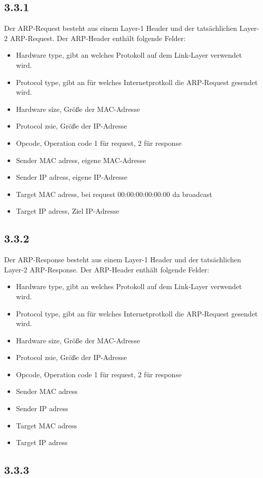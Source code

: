 \documentclass[a4paper,url]{article}
\begin{document}
\subsection*{3.3.1}
Der ARP-Request besteht aus einem Layer-1 Header und der tatsächlichen Layer-2 ARP-Request. Der ARP-Header enthält folgende Felder:
\begin{itemize}
	\item Hardware type, gibt an welches Protokoll auf dem Link-Layer verwendet wird.
	\item Protocol type, gibt an für welches Internetprotkoll die ARP-Request gesendet wird.
	\item Hardware size, Größe der MAC-Adresse
	\item Protocol zsie, Größe der IP-Adresse
	\item Opcode, Operation code 1 für request, 2 für response
	\item Sender MAC adress, eigene MAC-Adresse
	\item Sender IP adress, eigene IP-Adresse
	\item Target MAC adress, bei request 00:00:00:00:00:00 da broadcast
	\item Target IP adress, Ziel IP-Adresse
\end{itemize}

\subsection*{3.3.2}
Der ARP-Response besteht aus einem Layer-1 Header und der tatsächlichen Layer-2 ARP-Response. Der ARP-Header enthält folgende Felder:
\begin{itemize}
	\item Hardware type, gibt an welches Protokoll auf dem Link-Layer verwendet wird.
	\item Protocol type, gibt an für welches Internetprotkoll die ARP-Request gesendet wird.
	\item Hardware size, Größe der MAC-Adresse
	\item Protocol zsie, Größe der IP-Adresse
	\item Opcode, Operation code 1 für request, 2 für response
	\item Sender MAC adress
	\item Sender IP adress
	\item Target MAC adress
	\item Target IP adress
\end{itemize}

\subsection*{3.3.3}
\end{document}
